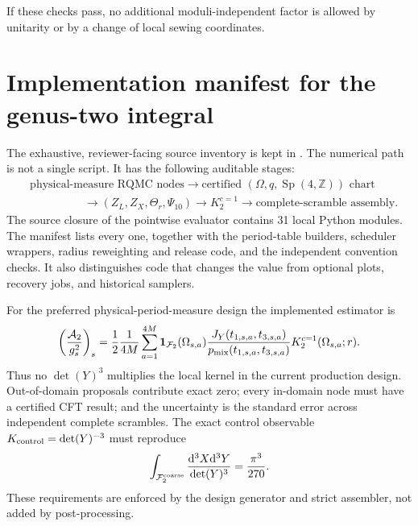 \documentclass[11pt]{article}
\numberwithin{equation}{section}
\newcommand{\dd}{\mathrm d}
\newcommand{\cA}{\mathcal A}
\newcommand{\cF}{\mathcal F}
\begin{document}
If these checks pass, no additional moduli-independent factor is allowed by
unitarity or by a change of local sewing coordinates.

\section{Implementation manifest for the genus-two integral}

The exhaustive, reviewer-facing source inventory is kept in
.  The numerical path is
not a single script.  It has the following auditable stages:
\begin{equation}
 \begin{aligned}
 &\text{physical-measure RQMC nodes}
 \longrightarrow
 \text{certified }(\Omega,q,\operatorname{Sp}(4,\mathbb Z))\text{ chart}
 \\
 &\hspace{2cm}\longrightarrow (Z_L,Z_X,\Theta_r,\Psi_{10})
 \longrightarrow K_2^{c=1}
 \longrightarrow \text{complete-scramble assembly}.
 \end{aligned}
\end{equation}
The source closure of the pointwise evaluator contains 31 local Python
modules.  The manifest lists every one, together with the period-table
builders, scheduler wrappers, radius reweighting and release code, and the
independent convention checks.  It also distinguishes code that changes the
value from optional plots, recovery jobs, and historical samplers.

For the preferred physical-period-measure design the implemented estimator is
\begin{equation}
 \left(\frac{\cA_2}{g_s^2}\right)_s
 =\frac12\frac1{4M}
 \sum_{a=1}^{4M}
 \mathbf 1_{\cF_2}(\Omega_{s,a})
 \frac{J_Y(t_{1,s,a},t_{3,s,a})}
      {p_{\rm mix}(t_{1,s,a},t_{3,s,a})}
 K_2^{c=1}(\Omega_{s,a};r).
 \label{eq:implemented-physical-mixture-estimator}
\end{equation}
Thus no $\det(Y)^3$ multiplies the local kernel in the current production
design.  Out-of-domain proposals contribute exact zero; every in-domain node
must have a certified CFT result; and the uncertainty is the standard error
across independent complete scrambles.  The exact control observable
$K_{\rm control}=\det(Y)^{-3}$ must reproduce
\begin{equation}
 \int_{\cF_2^{\rm coarse}}\frac{\dd^3X\dd^3Y}{\det(Y)^3}
 =\frac{\pi^3}{270}.
\end{equation}
These requirements are enforced by the design generator and strict assembler,
not added by post-processing.
\end{document}
